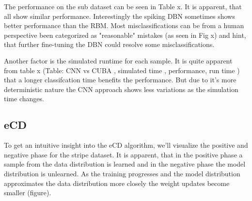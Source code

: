 The performance on the sub dataset can be seen in Table x.
It is apparent, that all show similar performance. Interestingly the spiking DBN sometimes shows better performance than the RBM.
Most misclassifications can be from a human perspective been categorized as "reasonable" mistakes (as seen in Fig x) and hint, that further fine-tuning the DBN could resolve some misclassifications.

Another factor is the simulated runtime for each sample. It is quite apparent from table x (Table: CNN vs CUBA , simulated time , performance, run time  ) that a longer classifcation time benefits the performance. But due to it's more deterministic nature the CNN approach shows less variations as the simulation time changes. 

\subsection{eCD}

To get an intuitive insight into the eCD algorithm, we'll visualize the positive and negative phase for the stripe dataset.
It is apparent, that in the positive phase a sample from the data distribution is learned and in the negative phase the model distribution is unlearned.
As the training progresses and the model distribution approximates the data distribution more closely the weight updates become smaller (figure). 

